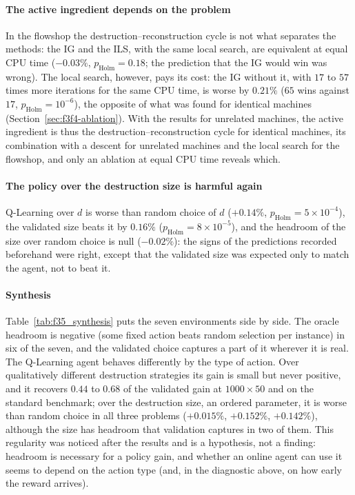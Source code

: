 \documentclass[final,3p,times,11pt,authoryear]{elsarticle}
\begin{document}
\paragraph{The active ingredient depends on the problem}
In the flowshop the destruction--reconstruction cycle is not what separates the methods: the IG and the ILS, with the same local search, are equivalent at equal CPU time ($-0.03\%$, $p_{\mathrm{Holm}}=0.18$; the prediction that the IG would win was wrong). The local search, however, pays its cost: the IG without it, with $17$ to $57$ times more iterations for the same CPU time, is worse by $0.21\%$ ($65$ wins against $17$, $p_{\mathrm{Holm}}=10^{-6}$), the opposite of what was found for identical machines (Section~\ref{sec:f3f4-ablation}). With the results for unrelated machines, the active ingredient is thus the destruction--reconstruction cycle for identical machines, its combination with a descent for unrelated machines and the local search for the flowshop, and only an ablation at equal CPU time reveals which.

\paragraph{The policy over the destruction size is harmful again}
Q-Learning over $d$ is worse than random choice of $d$ ($+0.14\%$, $p_{\mathrm{Holm}}=5\times10^{-4}$), the validated size beats it by $0.16\%$ ($p_{\mathrm{Holm}}=8\times10^{-5}$), and the headroom of the size over random choice is null ($-0.02\%$): the signs of the predictions recorded beforehand were right, except that the validated size was expected only to match the agent, not to beat it.

\paragraph{Synthesis}
Table~\ref{tab:f35_synthesis} puts the seven environments side by side. The oracle headroom is negative (some fixed action beats random selection per instance) in six of the seven, and the validated choice captures a part of it wherever it is real. The Q-Learning agent behaves differently by the type of action. Over qualitatively different destruction strategies its gain is small but never positive, and it recovers $0.44$ to $0.68$ of the validated gain at $1000\times50$ and on the standard benchmark; over the destruction size, an ordered parameter, it is worse than random choice in all three problems ($+0.015\%$, $+0.152\%$, $+0.142\%$), although the size has headroom that validation captures in two of them. This regularity was noticed after the results and is a hypothesis, not a finding: headroom is necessary for a policy gain, and whether an online agent can use it seems to depend on the action type (and, in the diagnostic above, on how early the reward arrives).
\end{document}
